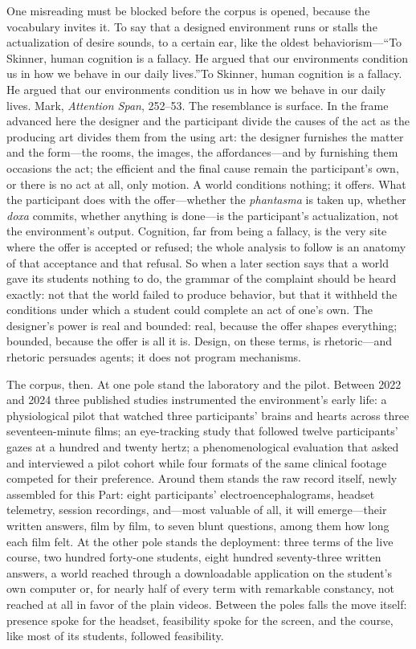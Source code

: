One misreading must be blocked before the corpus is opened, because the vocabulary invites it. To say that a designed environment runs or stalls the actualization of desire sounds, to a certain ear, like the oldest behaviorism---``To Skinner, human cognition is a fallacy. He argued that our environments condition us in how we behave in our daily lives.''To Skinner, human cognition is a fallacy. He argued that our environments condition us in how we behave in our daily lives. Mark, \textit{Attention Span}, 252--53. The resemblance is surface. In the frame advanced here the designer and the participant divide the causes of the act as the producing art divides them from the using art: the designer furnishes the matter and the form---the rooms, the images, the affordances---and by furnishing them occasions the act; the efficient and the final cause remain the participant's own, or there is no act at all, only motion. A world conditions nothing; it offers. What the participant does with the offer---whether the \textit{phantasma} is taken up, whether \textit{doxa} commits, whether anything is done---is the participant's actualization, not the environment's output. Cognition, far from being a fallacy, is the very site where the offer is accepted or refused; the whole analysis to follow is an anatomy of that acceptance and that refusal. So when a later section says that a world gave its students nothing to do, the grammar of the complaint should be heard exactly: not that the world failed to produce behavior, but that it withheld the conditions under which a student could complete an act of one's own. The designer's power is real and bounded: real, because the offer shapes everything; bounded, because the offer is all it is. Design, on these terms, is rhetoric---and rhetoric persuades agents; it does not program mechanisms.

The corpus, then. At one pole stand the laboratory and the pilot. Between 2022 and 2024 three published studies instrumented the environment's early life: a physiological pilot that watched three participants' brains and hearts across three seventeen-minute films; an eye-tracking study that followed twelve participants' gazes at a hundred and twenty hertz; a phenomenological evaluation that asked and interviewed a pilot cohort while four formats of the same clinical footage competed for their preference. Around them stands the raw record itself, newly assembled for this Part: eight participants' electroencephalograms, headset telemetry, session recordings, and---most valuable of all, it will emerge---their written answers, film by film, to seven blunt questions, among them how long each film felt. At the other pole stands the deployment: three terms of the live course, two hundred forty-one students, eight hundred seventy-three written answers, a world reached through a downloadable application on the student's own computer or, for nearly half of every term with remarkable constancy, not reached at all in favor of the plain videos. Between the poles falls the move itself: presence spoke for the headset, feasibility spoke for the screen, and the course, like most of its students, followed feasibility.

